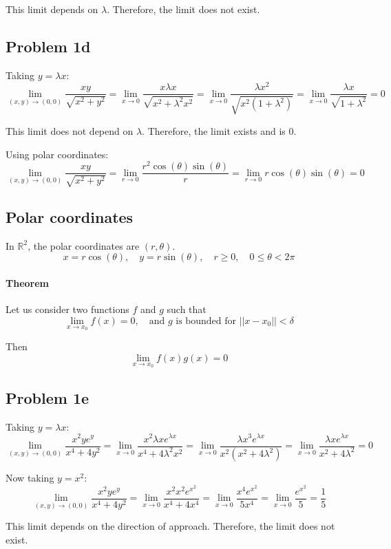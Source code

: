 \documentclass[11pt]{article}
\begin{document}
This limit depends on $\lambda$. Therefore, the limit does not exist.

\subsection*{Problem 1d}
Taking $y = \lambda x$:
\[
\lim_{(x,y) \to (0,0)} \frac{xy}{\sqrt{x^2 + y^2}} = \lim_{x \to 0} \frac{x\lambda x}{\sqrt{x^2 + \lambda^2 x^2}} = \lim_{x \to 0} \frac{\lambda x^2}{\sqrt{x^2(1 + \lambda^2)}} = \lim_{x \to 0} \frac{\lambda x}{\sqrt{1 + \lambda^2}} = 0
\]

This limit does not depend on $\lambda$. Therefore, the limit exists and is 0.

Using polar coordinates:
\[
\lim_{(x,y) \to (0,0)} \frac{xy}{\sqrt{x^2 + y^2}} = \lim_{r \to 0} \frac{r^2 \cos(\theta) \sin(\theta)}{r} = \lim_{r \to 0} r \cos(\theta) \sin(\theta) = 0
\]

\subsection{Polar coordinates}
In $\mathbb{R}^2$, the polar coordinates are $(r, \theta)$.
\[
x = r \cos(\theta), \quad y = r \sin(\theta), \quad r \geq 0, \quad 0 \leq \theta < 2\pi
\]

\paragraph{Theorem}
Let us consider two functions $f$ and $g$ such that
\[
\lim_{x \to x_0} f(x) = 0, \quad \text{and } g \text{ is bounded for } ||x - x_0|| < \delta
\]

Then
\[
\lim_{x \to x_0} f(x)g(x) = 0
\]

\subsection*{Problem 1e}
Taking $y = \lambda x$:
\[
\lim_{(x,y) \to (0,0)} \frac{x^2 ye^y}{x^4 + 4y^2} = \lim_{x \to 0} \frac{x^2 \lambda x e^{\lambda x}}{x^4 + 4\lambda^2 x^2} = \lim_{x \to 0} \frac{\lambda x^3 e^{\lambda x}}{x^2(x^2 + 4\lambda^2)} = \lim_{x \to 0} \frac{\lambda x e^{\lambda x}}{x^2 + 4\lambda^2} = 0
\]

Now taking $y = x^2$:
\[
\lim_{(x,y) \to (0,0)} \frac{x^2 ye^y}{x^4 + 4y^2} = \lim_{x \to 0} \frac{x^2 x^2 e^{x^2}}{x^4 + 4x^4} = \lim_{x \to 0} \frac{x^4 e^{x^2}}{5x^4} = \lim_{x \to 0} \frac{e^{x^2}}{5} = \frac{1}{5}
\]

This limit depends on the direction of approach. Therefore, the limit does not exist.
\end{document}
